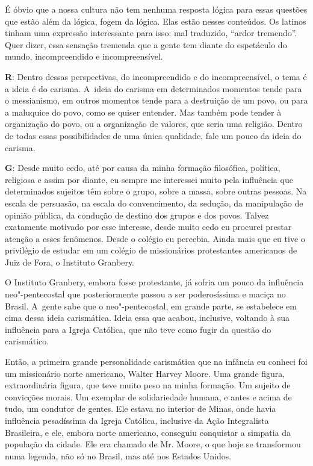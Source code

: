  

É óbvio que a nossa cultura não tem nenhuma resposta lógica para essas
questões que estão além da lógica, fogem da lógica. Elas estão nesses
conteúdos. Os latinos tinham uma expressão interessante para isso: mal
traduzido, ``ardor tremendo''. Quer dizer, essa sensação tremenda que a
gente tem diante do espetáculo do mundo, incompreendido e
incompreensível.

 

\textbf{R}: Dentro dessas perspectivas, do incompreendido e do
incompreensível, o tema é a ideia é do carisma. A~ideia do carisma em
determinados momentos tende para o messianismo, em outros momentos tende
para a destruição de um povo, ou para a maluquice do povo, como se
quiser entender. Mas também pode tender à organização do povo, ou a
organização de valores, que seria uma religião. Dentro de todas essas
possibilidades de uma única qualidade, fale um pouco da ideia do
carisma.

 

\textbf{G}: Desde muito cedo, até por causa da minha formação
filosófica, política, religiosa e assim por diante, eu sempre me
interessei muito pela influência que determinados sujeitos têm sobre o
grupo, sobre a massa, sobre outras pessoas. Na escala de persuasão, na
escala do convencimento, da sedução, da manipulação de opinião pública,
da condução de destino dos grupos e dos povos. Talvez exatamente
motivado por esse interesse, desde muito cedo eu procurei prestar
atenção a esses fenômenos. Desde o colégio eu percebia. Ainda mais que
eu tive o privilégio de estudar em um colégio de missionários
protestantes americanos de Juiz de Fora, o Instituto Granbery.

 

O Instituto Granbery, embora fosse protestante, já sofria um pouco da
influência neo"-pentecostal que posteriormente passou a ser poderosíssima
e maciça no Brasil. A~gente sabe que o neo"-pentecostal, em grande parte,
se estabelece em cima dessa ideia carismática. Ideia essa que acabou,
inclusive, voltando à sua influência para a Igreja Católica, que não teve
como fugir da questão do carismático.

 

Então, a primeira grande personalidade carismática que na infância eu
conheci foi um missionário norte americano, Walter Harvey Moore. Uma
grande figura, extraordinária figura, que teve muito peso na minha
formação. Um sujeito de convicções morais. Um exemplar de solidariedade
humana, e antes e acima de tudo, um condutor de gentes. Ele estava no
interior de Minas, onde havia influência pesadíssima da Igreja Católica,
inclusive da Ação Integralista Brasileira, e ele, embora norte
americano, conseguiu conquistar a simpatia da população da cidade. Ele
era chamado de Mr. Moore, o que hoje se transformou numa legenda, não só
no Brasil, mas até nos Estados Unidos.

